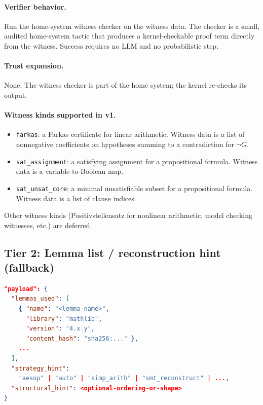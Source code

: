 \documentclass[11pt,letterpaper]{article}
\theoremstyle{definition}
\theoremstyle{remark}
\begin{document}
\paragraph{Verifier behavior.} Run the home-system witness checker on
the witness data. The checker is a small, audited home-system tactic
that produces a kernel-checkable proof term directly from the witness.
Success requires no LLM and no probabilistic step.

\paragraph{Trust expansion.} None. The witness checker is part of the
home system; the kernel re-checks its output.

\paragraph{Witness kinds supported in v1.}

\begin{itemize}[leftmargin=2em]
  \item \texttt{farkas}: a Farkas certificate for linear arithmetic.
        Witness data is a list of nonnegative coefficients on
        hypotheses summing to a contradiction for $\neg G$.
  \item \texttt{sat\_assignment}: a satisfying assignment for a
        propositional formula. Witness data is a variable-to-Boolean map.
  \item \texttt{sat\_unsat\_core}: a minimal unsatisfiable subset for a
        propositional formula. Witness data is a list of clause indices.
\end{itemize}

Other witness kinds (Positivstellensatz for nonlinear arithmetic, model
checking witnesses, etc.) are deferred.

\subsection{Tier 2: Lemma list / reconstruction hint (fallback)}
\label{sec:tier2}

\begin{lstlisting}[language=json]
"payload": {
  "lemmas_used": [
    { "name": "<lemma-name>",
      "library": "mathlib",
      "version": "4.x.y",
      "content_hash": "sha256:..." },
    ...
  ],
  "strategy_hint":
    "aesop" | "auto" | "simp_arith" | "smt_reconstruct" | ...,
  "structural_hint": <optional-ordering-or-shape>
}
\end{lstlisting}
\end{document}
